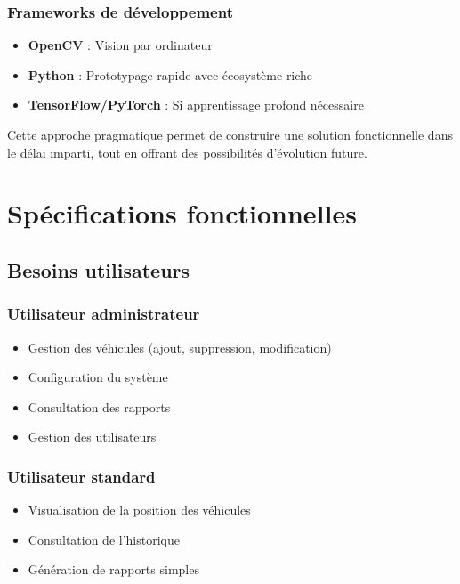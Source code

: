 \documentclass[12pt,a4paper]{article}
\begin{document}
\subsubsection{Frameworks de développement}

\begin{itemize}
    \item \textbf{OpenCV} : Vision par ordinateur
    \item \textbf{Python} : Prototypage rapide avec écosystème riche
    \item \textbf{TensorFlow/PyTorch} : Si apprentissage profond nécessaire
\end{itemize}

Cette approche pragmatique permet de construire une solution fonctionnelle dans le délai imparti, tout en offrant des possibilités d'évolution future.

\section{Spécifications fonctionnelles}

\subsection{Besoins utilisateurs}

\subsubsection{Utilisateur administrateur}
\begin{itemize}
    \item Gestion des véhicules (ajout, suppression, modification)
    \item Configuration du système
    \item Consultation des rapports
    \item Gestion des utilisateurs
\end{itemize}

\subsubsection{Utilisateur standard}
\begin{itemize}
    \item Visualisation de la position des véhicules
    \item Consultation de l'historique
    \item Génération de rapports simples
\end{itemize}
\end{document}
